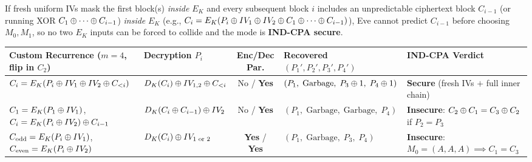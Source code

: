 \begin{compactitem}
  \item {} If fresh uniform IVs mask the first block(s) \emph{inside} $E_K$ and every subsequent block $i$ includes an unpredictable ciphertext block $C_{i-1}$ (or running XOR $C_1 \oplus \cdots \oplus C_{i-1}$) \emph{inside} $E_K$ (e.g., $C_i = E_K(P_i \oplus IV_1 \oplus IV_2 \oplus C_1 \oplus \cdots \oplus C_{i-1})$), Eve cannot predict $C_{i-1}$ before choosing $M_0, M_1$, so no two $E_K$ inputs can be forced to collide and the mode is \textbf{IND-CPA secure}.
\end{compactitem}

\begin{table}[h!]
\centering
\footnotesize
\begin{tabularx}{\textwidth}{@{}L{4.8cm} L{3.0cm} c L{3.8cm} Y@{}}
\toprule
\textbf{Custom Recurrence ($m=4$, flip in $C_2$)} & \textbf{Decryption $P_i$} & \textbf{Enc/Dec Par.} & \textbf{Recovered $(P_1', P_2', P_3', P_4')$} & \textbf{IND-CPA Verdict} \\
\midrule
$C_i = E_K(P_i \oplus IV_1 \oplus IV_2 \oplus C_{<i})$ & $D_K(C_i) \oplus IV_{1,2} \oplus C_{<i}$ & No / \textbf{Yes} & $(P_1,\; \text{Garbage},\; P_3 \oplus 1,\; P_4 \oplus 1)$ & \textbf{Secure} (fresh IVs $+$ full inner chain) \\
$C_1 = E_K(P_1 \oplus IV_1)$, $C_i = E_K(P_i \oplus IV_2) \oplus C_{i-1}$ & $D_K(C_i \oplus C_{i-1}) \oplus IV_2$ & No / \textbf{Yes} & $(P_1,\; \text{Garbage},\; \text{Garbage},\; P_4)$ & \textbf{Insecure}: $C_2 \oplus C_1 = C_3 \oplus C_2$ if $P_2 = P_3$ \\
$C_{\text{odd}} = E_K(P_i \oplus IV_1)$, $C_{\text{even}} = E_K(P_i \oplus IV_2)$ & $D_K(C_i) \oplus IV_{1\text{ or }2}$ & \textbf{Yes} / \textbf{Yes} & $(P_1,\; \text{Garbage},\; P_3,\; P_4)$ & \textbf{Insecure}: $M_0=(A,A,A) \implies C_1 = C_3$ \\
\bottomrule
\end{tabularx}
\end{table}

